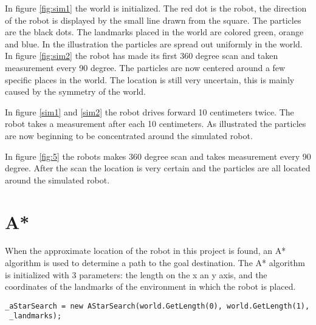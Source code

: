 In figure \ref{fig:sim1} the world is initialized. The red dot is the robot, the direction of the robot is displayed by the small line drawn from the square. The particles are the black dots. The landmarks placed in the world are colored green, orange and blue. In the illustration the particles are spread out uniformly in the world. In figure \ref{fig:sim2} the robot has made its first 360 degree scan and taken measurement every 90 degree. The particles are now centered around a few specific places in the world. The location is still very uncertain, this is mainly caused by the symmetry of the world.


In figure \ref{sim1} and \ref{sim2} the robot drives forward 10 centimeters twice. The robot takes a measurement after each 10 centimeters. As illustrated the particles are now beginning to be concentrated around the simulated robot.


In figure \ref{fig:5} the robots makes 360 degree scan and takes measurement every 90 degree. After the scan the location is very certain and the particles are all located around the simulated robot.


\section{A*}
When the approximate location of the robot in this project is found, an A* algorithm is used to determine a path to the goal destination. The A* algorithm is initialized with 3 parameters: the length on the x an y axis, and the coordinates of the landmarks of the environment in which the robot is placed. 

\lstset{style=sharpc}
\begin{lstlisting}[caption={Initialization of the A* algorithm}, label=lst:Astar_init, mathescape=true]             
_aStarSearch = new AStarSearch(world.GetLength(0), world.GetLength(1),
 _landmarks);
\end{lstlisting}

